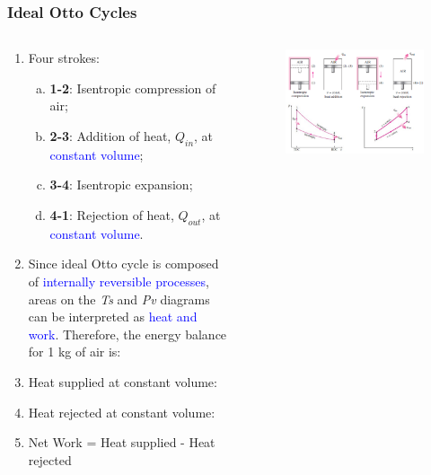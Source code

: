 \documentclass[10pt,compress]{beamer}
\newcommand{\blue}{\textcolor{blue}}
\begin{document}
\begin{frame}
 \frametitle{Ideal Otto Cycles}
  \begin{columns}
   \begin{column}[c]{0.6\linewidth}
    \begin{enumerate}[(1)]\scriptsize
      \item<1-> Four strokes:
      \begin{enumerate}[(a)]\scriptsize
         \item<1-> {\bf 1-2}: Isentropic compression of air;
         \item<1-> {\bf 2-3}: Addition of heat, $Q_{in}$, at \blue{constant volume};
         \item<1-> {\bf 3-4}: Isentropic expansion;
         \item<1-> {\bf 4-1}: Rejection of heat, $Q_{out}$, at \blue{constant volume}.
      \end{enumerate}
      \item<2-> Since ideal Otto cycle is composed of \blue{internally reversible processes}, areas on the {\it Ts} and {\it Pv} diagrams can be interpreted as \blue{heat and work}. Therefore, the energy balance for 1 kg of air is:
      \item<3-> Heat supplied at constant volume:
      \item<4-> Heat rejected at constant volume:
      \item<5-> Net Work = Heat supplied - Heat rejected
    \end{enumerate}
   \end{column}
   \begin{column}[c]{0.4\linewidth}
    \begin{figure}%
     \begin{center}
      \includegraphics[width=5.cm,clip]{./Pics/InternalCombustion_IdealOttoCycle2}

\end{center}
\end{figure}
\end{column}
\end{columns}
\end{frame}
\end{document}
